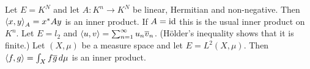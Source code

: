 \begin{exam}
	\begin{enum}
		\io Let $E=K^N$ and let $A: K^n \to K^N$ be linear, Hermitian and non-negative.
		Then ${\left\langle x,y \right\rangle}_A = x^*Ay$ is an inner product.
		If $A=\operatorname{id}$ this is the usual inner product on $K^n$.
		\io Let $E=l_2$ and ${\left\langle u,v \right\rangle} = \sum_{n=1}^\infty u_n \overline{v}_n$.
		(H\"older's inequality shows that it is finite.)
		\io Let $(X,\mu)$ be a measure space and let $E=L^2(X,\mu)$.
		Then ${\left\langle f,g \right\rangle} = \int_X f\overline{g} \, d\mu$ is an inner product.
	\end{enum}	
\end{exam}